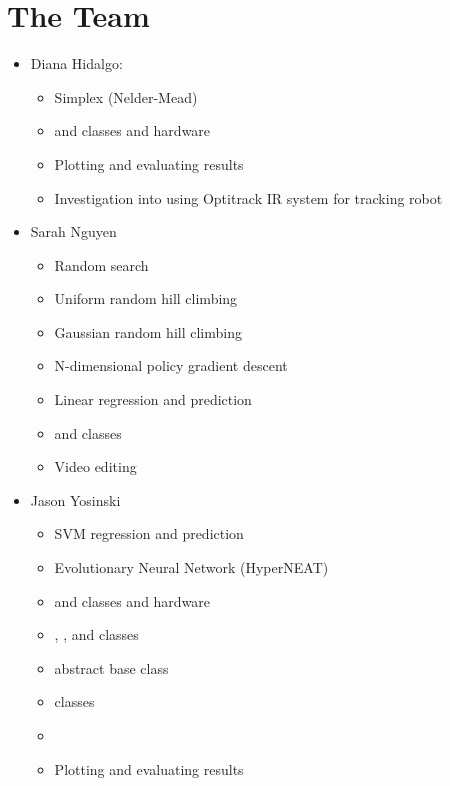 \section{The Team}

\begin{itemize}

\item Diana Hidalgo: 
\begin{itemize}
\item Simplex (Nelder-Mead)
\item {} and  classes and hardware
\item Plotting and evaluating results
\item Investigation into using Optitrack IR system for tracking robot
\end{itemize}

\item Sarah Nguyen
\begin{itemize}
\item Random search
\item Uniform random hill climbing
\item Gaussian random hill climbing
\item N-dimensional policy gradient descent
\item Linear regression and prediction
\item {} and  classes
\item Video editing
\end{itemize}

\item Jason Yosinski
\begin{itemize}
\item SVM regression and prediction
\item Evolutionary Neural Network (HyperNEAT)
\item {} and  classes and hardware
\item {}, , and  classes
\item {} abstract base class
\item {} classes
\item {}
\item Plotting and evaluating results
\end{itemize}

\end{itemize}

